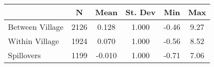 \begin{tabular}{l*{5}{c}}\hline&\multicolumn{1}{c}{N}&\multicolumn{1}{c}{Mean}&\multicolumn{1}{c}{St. Dev}&\multicolumn{1}{c}{Min}&\multicolumn{1}{c}{Max}\\ \hline 
Between Village & 2126 & 0.128 & 1.000 & -0.46 & 9.27 \\
Within Village & 1924 & 0.070 & 1.000 & -0.56 & 8.52 \\
Spillovers & 1199 & -0.010 & 1.000 & -0.71 & 7.06 \\
\hline \end{tabular}
